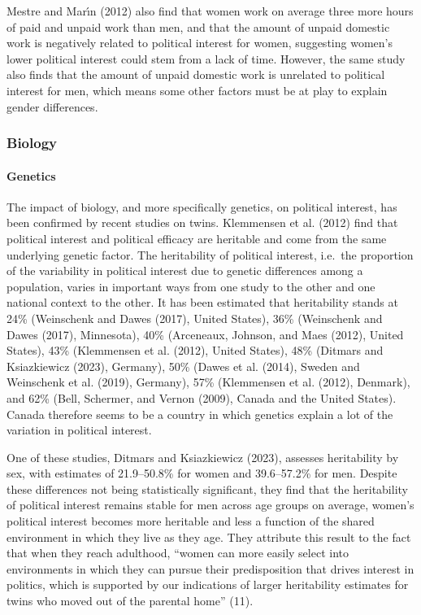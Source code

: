 \documentclass[
  letterpaper,
  DIV=11,
  numbers=noendperiod]{scrreprt}
\let\oldparagraph\paragraph
\renewcommand{\paragraph}[1]{\oldparagraph{#1}\mbox{}}
\begin{document}
Mestre and Marı́n (2012) also find that women work on average three more
hours of paid and unpaid work than men, and that the amount of unpaid
domestic work is negatively related to political interest for women,
suggesting women's lower political interest could stem from a lack of
time. However, the same study also finds that the amount of unpaid
domestic work is unrelated to political interest for men, which means
some other factors must be at play to explain gender differences.

\hypertarget{biology}{%
\subsubsection{Biology}\label{biology}}

\hypertarget{genetics}{%
\paragraph{Genetics}\label{genetics}}

The impact of biology, and more specifically genetics, on political
interest, has been confirmed by recent studies on twins. Klemmensen et
al. (2012) find that political interest and political efficacy are
heritable and come from the same underlying genetic factor. The
heritability of political interest, i.e.~the proportion of the
variability in political interest due to genetic differences among a
population, varies in important ways from one study to the other and one
national context to the other. It has been estimated that heritability
stands at 24\% (Weinschenk and Dawes (2017), United States), 36\%
(Weinschenk and Dawes (2017), Minnesota), 40\% (Arceneaux, Johnson, and
Maes (2012), United States), 43\% (Klemmensen et al. (2012), United
States), 48\% (Ditmars and Ksiazkiewicz (2023), Germany), 50\% (Dawes et
al. (2014), Sweden and Weinschenk et al. (2019), Germany), 57\%
(Klemmensen et al. (2012), Denmark), and 62\% (Bell, Schermer, and
Vernon (2009), Canada and the United States). Canada therefore seems to
be a country in which genetics explain a lot of the variation in
political interest.

One of these studies, Ditmars and Ksiazkiewicz (2023), assesses
heritability by sex, with estimates of 21.9--50.8\% for women and
39.6--57.2\% for men. Despite these differences not being statistically
significant, they find that the heritability of political interest
remains stable for men across age groups on average, women's political
interest becomes more heritable and less a function of the shared
environment in which they live as they age. They attribute this result
to the fact that when they reach adulthood, ``women can more easily
select into environments in which they can pursue their predisposition
that drives interest in politics, which is supported by our indications
of larger heritability estimates for twins who moved out of the parental
home'' (11).
\end{document}
